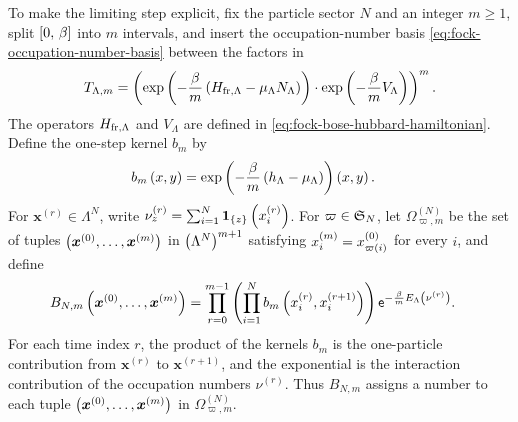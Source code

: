 \documentclass[11pt,a4paper]{article}
\theoremstyle{plain}
\theoremstyle{definition}
\theoremstyle{remark}
\begin{document}
To make the limiting step explicit, fix the particle sector \(N\) and an integer \(m \geq 1\), split \(\left[ 0,\,\beta \right]\) into \(m\) intervals, and insert the occupation-number basis \eqref{eq:fock-occupation-number-basis} between the factors in \begin{equation}
\begin{aligned}
T_{\Lambda,m}
=
\rbk{\fnexp{-\frac{\beta}{m}
\rbk{\physham_{\txtfr,\Lambda} -
\smchemicalpotential_{\Lambda}\opfocknumber_{\Lambda}}}
\cdot
\fnexp{-\frac{\beta}{m} V_{\Lambda}}}^{m}.
\end{aligned}
\label{eq:fock-finite-slice-trotter-product}
\end{equation} The operators \(\physham_{\txtfr,\Lambda}\) and \(V_{\Lambda}\) are defined in \eqref{eq:fock-bose-hubbard-hamiltonian}. Define the one-step kernel \(b_m\) by \begin{equation}
\begin{aligned}
\fun{b_m}{x,y}
& =
\fun{\fnexp{-\frac{\sminvtemperature}{m}
\rbk{\physham[h]_{\Lambda} - \smchemicalpotential_{\Lambda}}}}{x,y}.
\end{aligned}
\label{eq:fock-finite-slice-one-step-kernel}
\end{equation} For \(\boldsymbol{x}^{(r)} \in \Lambda^N\), write \(\nu_z^{(r)} = \sum_{i = 1}^{N}\boldsymbol{1}_{\left\{ z \right\}} \left( x_i^{(r)} \right)\). For \(\varpi \in \grsym{N}\), let \(\Omega_{\varpi,m}^{(N)}\) be the set of tuples \(\left( \boldsymbol{x}^{(0)},\ldots,\boldsymbol{x}^{(m)} \right)\) in \(\left( \Lambda^N \right)^{m+1}\) satisfying \(x_i^{(m)} = x_{\varpi \left( i \right)}^{(0)}\) for every \(i\), and define \begin{equation}
\begin{aligned}
\fun{B_{N,m}}{\boldsymbol{x}^{(0)},\ldots,\boldsymbol{x}^{(m)}}
& =
\prod_{r = 0}^{m - 1}
\rbk{
\prod_{i = 1}^{N}
\fun{b_m}{x_i^{(r)},x_i^{(r + 1)}}}
\napiernum^{-\frac{\sminvtemperature}{m}\fun{E_{\Lambda}}{\nu^{(r)}}}.
\end{aligned}
\label{eq:fock-finite-slice-sector-weight}
\end{equation} For each time index \(r\), the product of the kernels \(b_m\) is the one-particle contribution from \(\boldsymbol{x}^{(r)}\) to \(\boldsymbol{x}^{(r+1)}\), and the exponential is the interaction contribution of the occupation numbers \(\nu^{(r)}\). Thus \(B_{N,m}\) assigns a number to each tuple \(\left( \boldsymbol{x}^{(0)},\ldots,\boldsymbol{x}^{(m)} \right)\) in \(\Omega_{\varpi,m}^{(N)}\).
\end{document}
